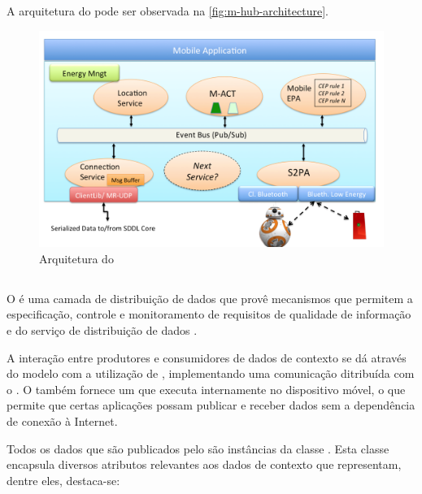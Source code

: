 A arquitetura do \middleware pode ser observada na \autoref{fig:m-hub-architecture}.

\begin{figure}[htb]
	\centering
	\caption{\label{fig:m-hub-architecture}Arquitetura do \mhub}
	\includegraphics[width=0.85\linewidth]{img/m-hub-architecture.png}
\end{figure}

\subsection{\cddl} \label{subsec:cddl}

O \cddl é uma camada de distribuição de dados que provê mecanismos que permitem a especificação, controle e monitoramento de requisitos de qualidade de informação e do serviço de distribuição de dados \cite{gomes:2017}.

A interação entre produtores e consumidores de dados de contexto se dá através do modelo \pubsub com a utilização de \brokers, implementando uma comunicação ditribuída com o \mqtt. O \cddl também fornece um \ubroker que executa internamente no dispositivo móvel, o que permite que certas aplicações possam publicar e receber dados sem a dependência de conexão à Internet.

Todos os dados que são publicados pelo \cddl são instâncias da classe \msg.
Esta classe encapsula diversos atributos relevantes aos dados de contexto que representam, dentre eles, destaca-se:

